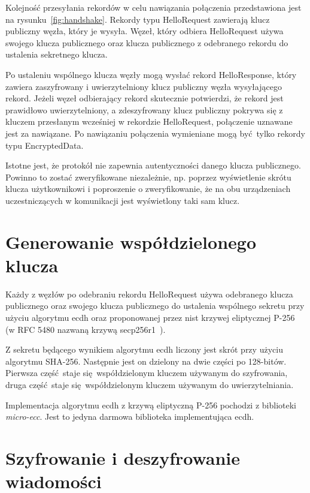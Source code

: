 Kolejność przesyłania rekordów w celu nawiązania połączenia przedstawiona jest na rysunku~\ref{fig:handshake}. Rekordy typu HelloRequest zawierają klucz publiczny węzła, który je wysyła. Węzeł, który odbiera HelloRequest używa swojego klucza publicznego oraz klucza publicznego z odebranego rekordu do ustalenia sekretnego klucza.

Po ustaleniu wspólnego klucza węzły mogą wysłać rekord HelloResponse, który zawiera zaszyfrowany i uwierzytelniony klucz publiczny węzła wysyłającego rekord. Jeżeli węzeł odbierający rekord skutecznie potwierdzi, że rekord jest prawidłowo uwierzytelniony, a zdeszyfrowany klucz publiczny pokrywa się z kluczem przesłanym wcześniej w rekordzie HelloRequest, połączenie uznawane jest za nawiązane. Po nawiązaniu połączenia wymieniane mogą być tylko rekordy typu EncryptedData.

Istotne jest, że protokół nie zapewnia autentyczności danego klucza publicznego. Powinno to zostać zweryfikowane niezależnie, np. poprzez wyświetlenie skrótu klucza użytkownikowi i poproszenie o zweryfikowanie, że na obu urządzeniach uczestniczących w komunikacji jest wyświetlony taki sam klucz.

\section{Generowanie współdzielonego klucza}
\label{sec:sharedkey}

Każdy z węzłów po odebraniu rekordu HelloRequest używa odebranego klucza publicznego oraz swojego klucza publicznego do ustalenia wspólnego sekretu przy użyciu algorytmu \gls{ecdh} oraz proponowanej przez \gls{nist} krzywej eliptycznej P-256~\cite{kerry2013digital} (w RFC 5480 nazwaną krzywą secp256r1~\cite{turner2009elliptic}).

Z sekretu będącego wynikiem algorytmu \gls{ecdh} liczony jest skrót przy użyciu algorytmu SHA-256. Następnie jest on dzielony na dwie części po 128-bitów. Pierwsza część staje się współdzielonym kluczem używanym do szyfrowania, druga część staje się współdzielonym kluczem używanym do uwierzytelniania.

Implementacja algorytmu \gls{ecdh} z krzywą eliptyczną P-256 pochodzi z biblioteki \emph{micro-ecc}. Jest to jedyna darmowa biblioteka implementująca \gls{ecdh}.

\section{Szyfrowanie i deszyfrowanie wiadomości}
\label{sec:encrypt}

